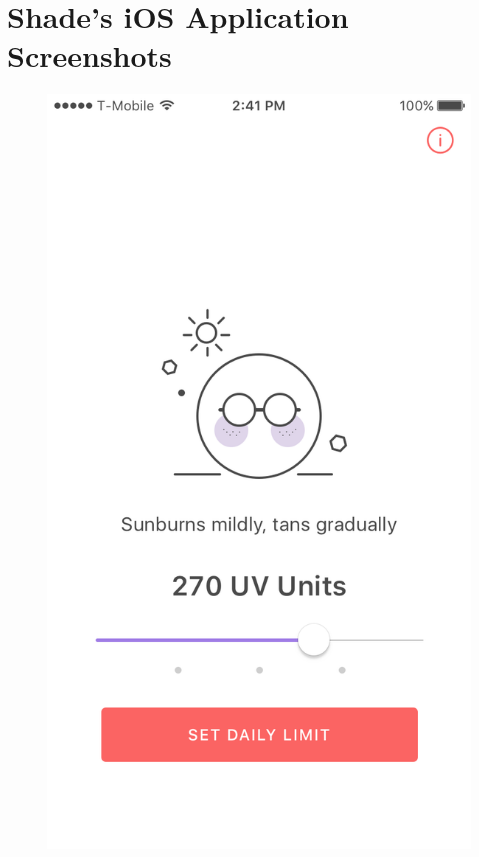 \documentclass[12pt,openany,a4paper]{book}
\begin{document}

\cleardoublepage

\chapter{Shade's iOS Application Screenshots}
\label{app:shade_screenshots}

\begin{figure}[h]
\includegraphics[width=\textwidth]{ShadeOnboarding.png}
\end{figure}
\end{document}

